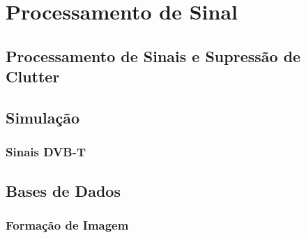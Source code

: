 
\chapter{Processamento de Sinal} %
\label{chap:Chapter4} %


\section{Processamento de Sinais e Supressão de Clutter}



\section{Simulação}

\subsection{Sinais DVB-T}




\section{Bases de Dados}

\subsection{Formação de Imagem}